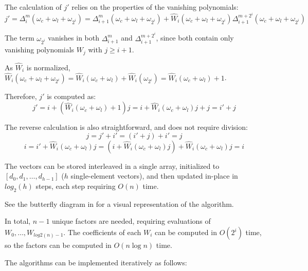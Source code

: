 The calculation of $j'$ relies on the properties of the vanishing polynomials: \[j' = \Delta_i^{m}(\omega_c + \omega_l + \omega_{2^i}) = \Delta_{i+1}^m(\omega_c + \omega_l + \omega_{2^i}) + \hat{W}_i(\omega_c + \omega_l + \omega_{2^i}) \Delta_{i+1}^{m + 2^i}(\omega_c + \omega_l + \omega_{2^i})\]

The term $\omega_{2^i}$ vanishes in both $\Delta_{i+1}^m$ and $\Delta_{i+1}^{m + 2^i}$, since both contain only vanishing polynomials $W_j$ with $j \geq i + 1$.

As $\hat{W}_i$ is normalized, $\hat{W}_i(\omega_c + \omega_l + \omega_{2^i}) = \hat{W}_i(\omega_c + \omega_l) + \hat{W}_i(\omega_{2^i}) = \hat{W}_i(\omega_c + \omega_l) + 1$.

Therefore, $j'$ is computed as: \[j' = i + (\hat{W}_i(\omega_c + \omega_l) + 1) j = i + \hat{W}_i(\omega_c + \omega_l) j + j = i' + j\]

The reverse calculation is also straightforward, and does not require division: \[j = j' + i' = (i' + j) + i' = j\] \[i = i' + \hat{W}_i(\omega_c + \omega_l) j = (i + \hat{W}_i(\omega_c + \omega_l) j) + \hat{W}_i(\omega_c + \omega_l) j = i\]

The vectors can be stored interleaved in a single array, initialized to $[d_0, d_1, \ldots, d_{h - 1}]$ ($h$ single-element vectors), and then updated in-place in $log_2(h)$ steps, each step requiring $O(n)$ time.

See the butterfly diagram in \cite{novel-poly} for a visual representation of the algorithm.

In total, $n - 1$ unique factors are needed, requiring evaluations of $W_0, \ldots, W_{log2(n) - 1}$. The coefficients of each $W_i$ can be computed in $O(2^i)$ time, so the factors can be computed in $O(n \log n)$ time.

The algorithms can be implemented iteratively as follows:

